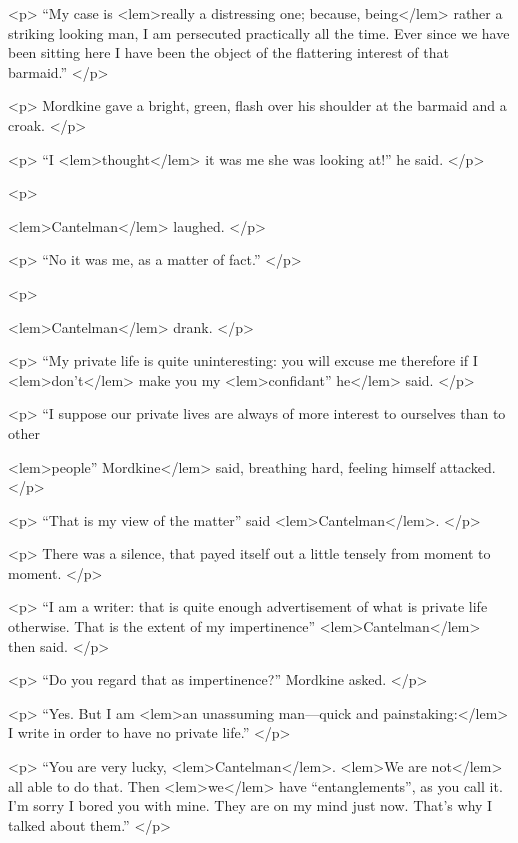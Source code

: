 {{				<p>
				“My case is 
<lem>really a distressing one; because, being</lem>
					{} 
				rather a striking looking man, I 
				am persecuted practically all the time. Ever since we have been sitting here I have 
				been the object of the flattering interest of that barmaid.” 
 				</p> 

				<p>
				Mordkine gave a bright, green, flash over his shoulder at the barmaid and a croak. 
 				</p> 

				<p>
				“I 
<lem>thought</lem>
					{} 
				it was me she was looking at!” he said. 
 				</p> 

				<p>
				
<lem>Cantelman</lem>{} laughed. 
 				</p> 

				<p>
				“No it was me, as a matter of fact.” 
 				</p> 

				<p>
				
<lem>Cantelman</lem>{} drank. 
 				</p> 

				<p>
				“My private life is quite uninteresting: you will excuse me therefore if I 
<lem>don't</lem>{} 
				make you my 
<lem>confidant” he</lem>{} said. 
 				</p> 

				<p>
				“I suppose our private lives are always of more interest to ourselves than to other 
				
<lem>people” Mordkine</lem>
					{} said, breathing hard, feeling himself attacked. 
 				</p> 

				<p>
				“That is my view of the matter” said 
<lem>Cantelman</lem>{}. 
 				</p> 

				<p>
				There was a silence, that payed itself out a little tensely from moment to moment. 
 				</p> 

				<p>
				“I am a writer: that is quite enough advertisement  of what is private life otherwise.
				That is the extent of my impertinence” 
<lem>Cantelman</lem>{} then said. 
 				</p> 

				<p>
				“Do you regard that as impertinence?” Mordkine asked. 
 				</p> 

				<p>
				“Yes. But I am 
<lem>an unassuming man---quick and painstaking:</lem>
					{} 
				I write in order to have no private life.” 
 				</p> 

				<p>
				“You are very lucky, 
<lem>Cantelman</lem>{}. 
<lem>We are not</lem>
					{} 
				all able to do that. Then 
<lem>we</lem>
					{} 
				have “entanglements”, as you call it. I'm sorry I bored you with mine. They are on 
				my mind just now. That's why I talked about them.” 
 				</p> 

}}

